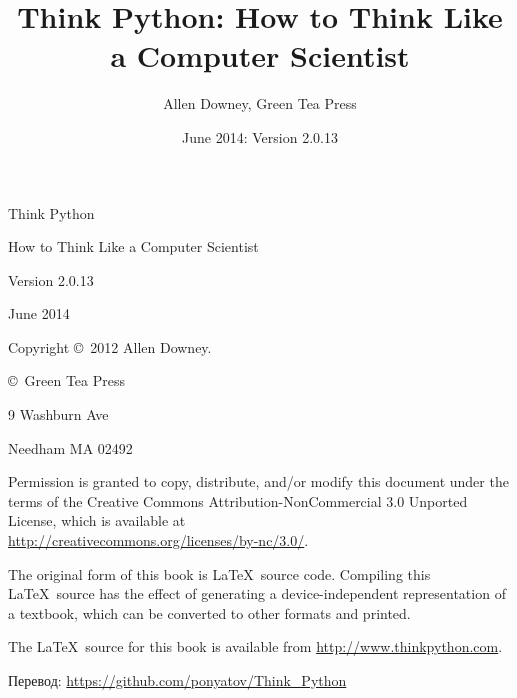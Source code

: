\documentclass[oneside,12pt]{book}
\author{Allen Downey, Green Tea Press}
\title{Think Python: How to Think Like a Computer Scientist}
\date{June 2014: Version 2.0.13}
\begin{document}
\maketitle

\begin{titlepage}
Think Python
\bigskip

How to Think Like a Computer Scientist
\bigskip

Version 2.0.13
\bigskip

June 2014
\bigskip

Copyright \copyright\ 2012 Allen Downey.
\bigskip

\copyright\ Green Tea Press 

9 Washburn Ave 

Needham MA 02492 
\bigskip

Permission is granted to copy, distribute, and/or modify this document under the
terms of the Creative Commons Attribution-NonCommercial 3.0 Unported License,
which is available at\\ \url{http://creativecommons.org/licenses/by-nc/3.0/}.
\bigskip

The original form of this book is \LaTeX\ source code. Compiling this \LaTeX\
source has the effect of generating a device-independent representation of a textbook,
which can be converted to other formats and printed.
\bigskip

The \LaTeX\ source for this book is available from
\url{http://www.thinkpython.com}.

\bigskip
Перевод: \url{https://github.com/ponyatov/Think_Python}

\end{titlepage}

\tableofcontents


\end{document}
